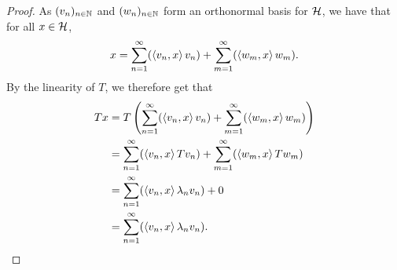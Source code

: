 \begin{proof}
  \medskip

  As $(v_n)_{n \in \mathbb{N}}$ and $(w_n)_{n \in \mathbb{N}}$ form an orthonormal basis for $\mathcal{H}$, we have that for all $x \in \mathcal{H}$,
  \begin{equation*}
    x = \sum_{n=1}^{\infty} ( \left\langle v_n, x\right\rangle v_n ) + \sum_{m=1}^{\infty} (\left\langle w_m, x\right\rangle w_m).
  \end{equation*}
  By the linearity of $T$, we therefore get that
  \begin{align*}
    Tx
    &=
    T\left(  \sum_{n=1}^{\infty} ( \left\langle v_n, x\right\rangle v_n ) + \sum_{m=1}^{\infty} (\left\langle w_m, x\right\rangle w_m) \right) \\
    &=
    \sum_{n=1}^{\infty} ( \left\langle v_n, x\right\rangle T v_n ) + \sum_{m=1}^{\infty} (\left\langle w_m, x\right\rangle T w_m) \\
    &=
    \sum_{n=1}^{\infty} ( \left\langle v_n, x\right\rangle \lambda_n v_n ) + 0 \\
    &=
    \sum_{n=1}^{\infty} ( \left\langle v_n, x\right\rangle \lambda_n v_n ).
  \end{align*}
\end{proof}
